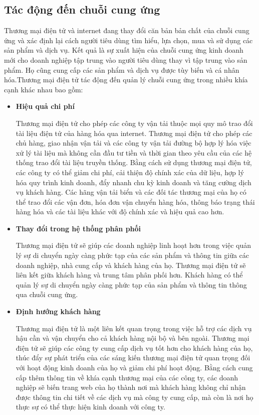 \documentclass[12pt]{article}
\begin{document}
\subsection{Tác động đến chuỗi cung ứng}
Thương mại điện tử và internet đang thay đổi căn bản bản chất của chuỗi cung ứng và xác định lại cách người tiêu dùng tìm hiểu, lựa chọn, mua và sử dụng các sản phẩm và dịch vụ. Kết quả là sự xuất hiện của chuỗi cung ứng kinh doanh mới cho doanh nghiệp tập trung vào người tiêu dùng thay vì tập trung vào sản phẩm. Họ cũng cung cấp các sản phẩm và dịch vụ được tùy biến và cá nhân hóa.Thương mại điện tử tác động đến quản lý chuỗi cung ứng trong nhiều khía cạnh khác nhau bao gồm:
\begin{itemize}
\item \textbf{Hiệu quả chi phí}

Thương mại điện tử cho phép các công ty vận tải thuộc mọi quy mô trao đổi tài liệu điện tử của hàng hóa qua internet. Thương mại điện tử cho phép các chủ hàng, giao nhận vận tải và các công ty vận tải đường bộ hợp lý hóa việc xử lý tài liệu mà không cần đầu tư tiền và thời gian theo yêu cầu của các hệ thống trao đổi tài liệu truyền thống. Bằng cách sử dụng thương mại điện tử, các công ty có thể giảm chi phí, cải thiện độ chính xác của dữ liệu, hợp lý hóa quy trình kinh doanh, đẩy nhanh chu kỳ kinh doanh và tăng cường dịch vụ khách hàng. Các hãng vận tải biển và các đối tác thương mại của họ có thể trao đổi các vận đơn, hóa đơn vận chuyển hàng hóa, thông báo trạng thái hàng hóa và các tài liệu khác với độ chính xác và hiệu quả cao hơn.

\item \textbf{Thay đổi trong hệ thống phân phối}

Thương mại điện tử sẽ giúp các doanh nghiệp linh hoạt hơn trong việc quản lý sự di chuyển ngày càng phức tạp của các sản phẩm và thông tin giữa các doanh nghiệp, nhà cung cấp và khách hàng của họ. Thương mại điện tử sẽ liên kết giữa khách hàng và trung tâm phân phối hơn. Khách hàng có thể quản lý sự di chuyển ngày càng phức tạp của sản phẩm và thông tin thông qua chuỗi cung ứng.

\item \textbf{Định hướng khách hàng}

Thương mại điện tử là một liên kết quan trọng trong việc hỗ trợ các dịch vụ hậu cần và vận chuyển cho cả khách hàng nội bộ và bên ngoài. Thương mại điện tử sẽ giúp các công ty cung cấp dịch vụ tốt hơn cho khách hàng của họ, thúc đẩy sự phát triển của các sáng kiến thương mại điện tử quan trọng đối với hoạt động kinh doanh của họ và giảm chi phí hoạt động. Bằng cách cung cấp thêm thông tin về khía cạnh thương mại của các công ty, các doanh nghiệp sẽ biến trang web của họ thành nơi mà khách hàng không chỉ nhận được thông tin chi tiết về các dịch vụ mà công ty cung cấp, mà còn là nơi họ thực sự có thể thực hiện kinh doanh với công ty.

\end{itemize} 
\end{document}
